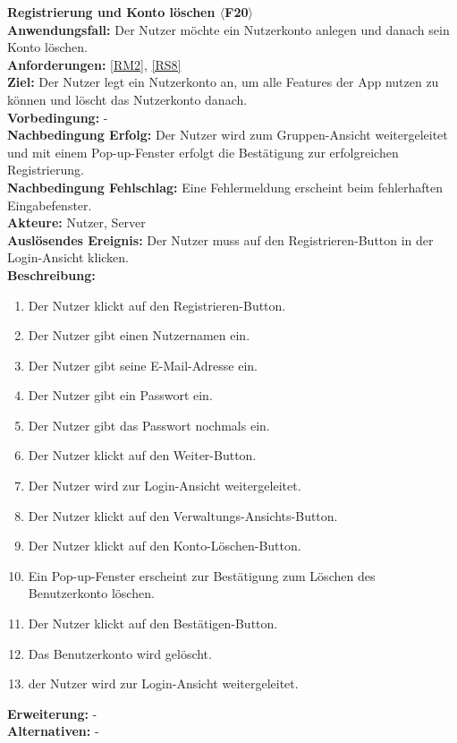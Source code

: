 \documentclass[parskip=full]{scrartcl}
\begin{document}
\textbf{Registrierung und Konto löschen $\langle$F20$\rangle$}\\
\textbf{Anwendungsfall:} Der Nutzer möchte ein Nutzerkonto anlegen und danach sein Konto löschen.\\
\textbf{Anforderungen:} \ref{RM2}, \ref{RS8} \\
\textbf{Ziel:} Der Nutzer legt ein Nutzerkonto an, um alle Features der App nutzen zu können und löscht das Nutzerkonto danach.\\
\textbf{Vorbedingung:} -\\
\textbf{Nachbedingung Erfolg:} Der Nutzer wird zum Gruppen-Ansicht weitergeleitet und mit einem Pop-up-Fenster erfolgt die Bestätigung zur erfolgreichen Registrierung.\\
\textbf{Nachbedingung Fehlschlag:} Eine Fehlermeldung erscheint beim fehlerhaften Eingabefenster.\\
\textbf{Akteure:} Nutzer, Server\\
\textbf{Auslösendes Ereignis:} Der Nutzer muss auf den Registrieren-Button in der Login-Ansicht klicken.\\
\textbf{Beschreibung:}
\begin{enumerate}
    \item Der Nutzer klickt auf den Registrieren-Button.
    \item Der Nutzer gibt einen Nutzernamen ein.
    \item Der Nutzer gibt seine E-Mail-Adresse ein.
    \item Der Nutzer gibt ein Passwort ein.
    \item Der Nutzer gibt das Passwort nochmals ein.
    \item Der Nutzer klickt auf den Weiter-Button.
    \item Der Nutzer wird zur Login-Ansicht weitergeleitet.
    \item Der Nutzer klickt auf den Verwaltungs-Ansichts-Button.
    \item Der Nutzer klickt auf den Konto-Löschen-Button.
    \item Ein Pop-up-Fenster erscheint zur Bestätigung zum Löschen des Benutzerkonto löschen.
    \item Der Nutzer klickt auf den Bestätigen-Button.
    \item Das Benutzerkonto wird gelöscht.
    \item der Nutzer wird zur Login-Ansicht weitergeleitet.
\end{enumerate}
\textbf{Erweiterung:} -\\
\textbf{Alternativen:} -\\
\newpage
\end{document}
